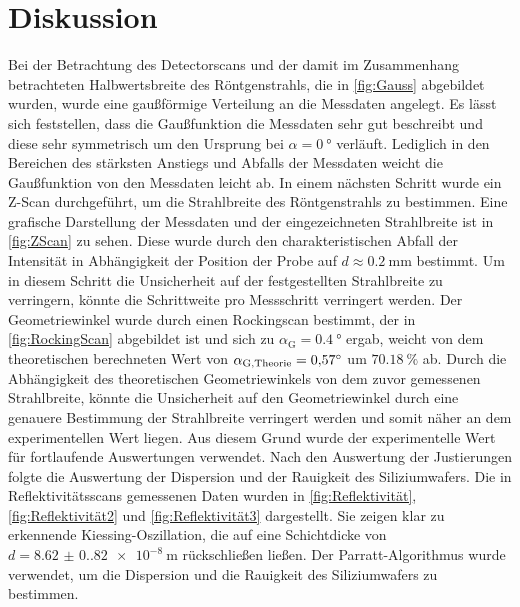\section{Diskussion}
\label{sec:Diskussion}

Bei der Betrachtung des Detectorscans und der damit im Zusammenhang betrachteten Halbwertsbreite des Röntgenstrahls, die in \autoref{fig:Gauss} abgebildet wurden, wurde eine gaußförmige Verteilung an die Messdaten angelegt.
Es lässt sich feststellen, dass die Gaußfunktion die Messdaten sehr gut beschreibt und diese sehr symmetrisch um den Ursprung bei $\alpha=\SI{0}{\degree}$ verläuft.
Lediglich in den Bereichen des stärksten Anstiegs und Abfalls der Messdaten weicht die Gaußfunktion von den Messdaten leicht ab. \newline
In einem nächsten Schritt wurde ein Z-Scan durchgeführt, um die Strahlbreite des Röntgenstrahls zu bestimmen.
Eine grafische Darstellung der Messdaten und der eingezeichneten Strahlbreite ist in \autoref{fig:ZScan} zu sehen.
Diese wurde durch den charakteristischen Abfall der Intensität in Abhängigkeit der Position der Probe auf $d\approx\SI{0.2}{\milli\meter}$ bestimmt.
Um in diesem Schritt die Unsicherheit auf der festgestellten Strahlbreite zu verringern, könnte die Schrittweite pro Messschritt verringert werden. \newline
Der Geometriewinkel wurde durch einen Rockingscan bestimmt, der in \autoref{fig:RockingScan} abgebildet ist und sich zu $\alpha_{\text{G}}=\SI{0.4}{\degree}$ ergab, weicht von dem theoretischen berechneten Wert von $\alpha_{\text{G,\text{Theorie}}}=\SI{0.57}{\degree}$ um $\SI{70.18}{\percent}$ ab.
Durch die Abhängigkeit des theoretischen Geometriewinkels von dem zuvor gemessenen Strahlbreite, könnte die Unsicherheit auf den Geometriewinkel durch eine genauere Bestimmung der Strahlbreite verringert werden und somit näher an dem experimentellen Wert liegen.
Aus diesem Grund wurde der experimentelle Wert für fortlaufende Auswertungen verwendet. \newline
Nach den Auswertung der Justierungen folgte die Auswertung der Dispersion und der Rauigkeit des Siliziumwafers.
Die in Reflektivitätsscans gemessenen Daten wurden in \autoref{fig:Reflektivität}, \autoref{fig:Reflektivität2} und \autoref{fig:Reflektivität3} dargestellt.
Sie zeigen klar zu erkennende Kiessing-Oszillation, die auf eine Schichtdicke von $d = \SI{8.62(0.82)e-8}{\meter}$ rückschließen ließen.\newline
Der Parratt-Algorithmus wurde verwendet, um die Dispersion und die Rauigkeit des Siliziumwafers zu bestimmen.
